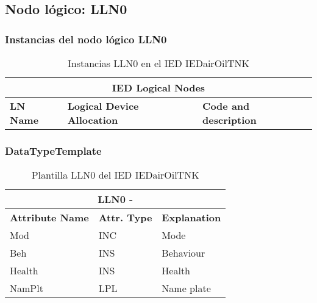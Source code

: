 
\subsection{Nodo l\'ogico: 			 LLN0}

    \subsubsection{Instancias del nodo l\'ogico LLN0}
    \begin{table}[H]
    \begin{center}
    \begin{tabular}{|l|l|p{6.8cm}|}
            \hline
            \multicolumn{3}{|c|}{\cellcolor[gray]{0.8} \textbf{IED Logical Nodes} } \\
            \hline
            \textbf{LN Name} & \textbf{Logical Device Allocation} & \textbf{Code and description} \\
            \hline
    \end{tabular}
    \caption{Instancias LLN0 en el IED IEDairOilTNK}
    \label{table:lnInstLLN0_1}
    \end{center}
    \end{table}
    
    
    
    \subsubsection{DataTypeTemplate}
    \begin{table}[H]
    \begin{center}
    \begin{tabular}{|l|l|p{8.5cm}|}
            \hline
            \multicolumn{3}{|c|}{\cellcolor[gray]{0.8} \textbf{ LLN0}  -  } \\
            \hline
            \textbf{Attribute Name} & \textbf{Attr. Type} & \textbf{Explanation} \\
            \hline 
            Mod & INC & Mode \\
            \hline
            Beh & INS & Behaviour \\
            \hline
            Health & INS & Health \\
            \hline
            NamPlt & LPL & Name plate \\
            \hline
    \end{tabular}
    \caption{Plantilla LLN0 del IED IEDairOilTNK}
    \label{table:lnTypeLLN0_1}
    \end{center}
    \end{table}
    
    
    